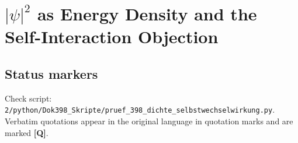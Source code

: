 
\providecommand{\BM}{\textbf{[B]}}
\providecommand{\KM}{\textbf{[K]}}
\providecommand{\SM}{\textbf{[S]}}
\providecommand{\XM}{\textbf{[X]}}
\providecommand{\QM}{\textbf{[Q]}}
\providecommand{\EM}{\textbf{[E]}}

\chapter*{$|\psi|^2$ as Energy Density and the Self-Interaction Objection}

\begin{abstract}
In the FFGFT, $|\psi|^2$ is not a probability but an energy density; the Born values appear as
geometric quotients (Docs.~020, 129, 230). This reading has a famous predecessor, Schrödinger's
charge density $-e|\psi|^2$ of 1926, and an equally well-known objection: if the density were real,
its parts would have to act on one another, and this self-interaction is not observed. This document
presents Schrödinger's reading and Gao's objection with verbatim quotations and recomputes it. For the
hydrogen atom the Coulomb self-energy of the 1s density would be 17.0\,eV, and the 1S--2S spacing
would shift by 12.9\,eV, more than the transition itself, which is measured to about
$4\times10^{-15}$. A self-repelling charge cloud extended in position space is therefore excluded.
The objection, however, presupposes two things: that the density is a continuum of parts in position
space, and that each part is a source for the others. The FFGFT shares neither. Its density is the
energy density of the inner configuration of one mode (Docs.~020, 230), a mode is one source with one
time scale (Doc.~334), and the field follows the realized position (Doc.~020). In field theory this
corresponds to the normal-ordered interaction term, which vanishes in the one-particle sector; this
is shown exactly. Whether the FFGFT reading delivers this property from the structure of the carrier
itself remains open. A test follows: the FFGFT expects no Schrödinger--Newton self-gravity.
\end{abstract}

\section*{Status markers}

Check script: \texttt{2/python/Dok398\_Skripte/pruef\_398\_dichte\_selbstwechselwirkung.py}.
Verbatim quotations appear in the original language in quotation marks and are marked \QM.

